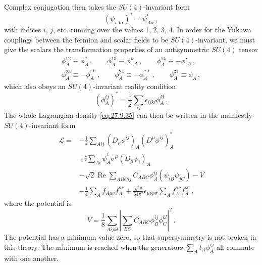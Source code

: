 Complex conjugation then takes the \(SU(4)\)-invariant form
\begin{equation}
  (\psi_{iA\alpha})^*=\bar\psi^i_{A\dot\alpha}\,,
  \tag{27.9.40}\label{eq:27.9.40}
\end{equation}
with indices \(i\), \(j\), etc. running over the values 1, 2, 3, 4. In order
for the Yukawa couplings between the fermion and scalar fields to be
\(SU(4)\)-invariant, we must give the scalars the transformation properties
of an antisymmetric \(SU(4)\) tensor
\begin{equation}
  \begin{gathered}
  \phi_A^{12}\equiv\phi_A^*\,,
  \qquad
  \phi_A^{13}\equiv\phi''_A\,,
  \qquad
  \phi_A^{14}\equiv-\phi'_A\,,
  \\
  \phi_A^{23}\equiv-\phi_A^{\prime *}\,,
  \qquad
  \phi_A^{24}\equiv-\phi_A^{\prime\prime *}\,,
  \qquad
  \phi_A^{34}\equiv\phi_A\,,
  \end{gathered}
  \tag{27.9.41}\label{eq:27.9.41}
\end{equation}
which also obeys an \(SU(4)\)-invariant reality condition
\begin{equation}
  (\phi_A^{ij})^*
  =\frac12\sum_{kl}\epsilon_{ijkl}\phi_A^{kl}\,.
  \tag{27.9.42}\label{eq:27.9.42}
\end{equation}
The whole Lagrangian density \eqref{eq:27.9.35} can then be written in the
manifestly \(SU(4)\)-invariant form
\begin{equation}
  \begin{aligned}
  \mathcal{L}={}&
  -\frac12\sum_{Aij}(D_\mu\phi^{ij})_A(D^\mu\phi^{ij})_A^*
  \\
  &+\ii\sum_{Ai}
    \bar\psi_A^i\bar\sigma^\mu(D_\mu\psi_i)_A
  \\
  &-\sqrt{2}\operatorname{Re}\sum_{ABCij}C_{ABC}\phi_A^{ij}
    \left(\psi_{iB}\psi_{jC}\right)-V
  \\
  &-\frac14\sum_Af_{A\mu\nu}f_A^{\mu\nu}
  +\frac{g^2\theta}{64\pi^2}\epsilon_{\mu\nu\rho\sigma}
    \sum_Af_A^{\mu\nu}f_A^{\rho\sigma}\,,
  \end{aligned}
  \tag{27.9.43}\label{eq:27.9.43}
\end{equation}
where the potential is
\begin{equation}
  V=\frac18\sum_{Aijkl}\left|
    \sum_{BC}C_{ABC}\phi_B^{ij}\phi_C^{kl}
  \right|^2\,.
  \tag{27.9.44}\label{eq:27.9.44}
\end{equation}
The potential has a minimum value zero, so that supersymmetry is not broken
in this theory. The minimum is reached when the generators
\(\sum_A t_A\phi_A^{ij}\) all commute with one another.

